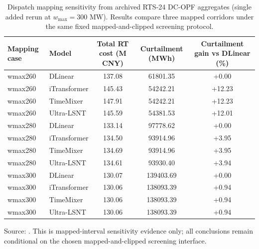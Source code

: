 ﻿\documentclass[review,1p,times]{elsarticle}
\begin{document}
\begin{table}[t]
\centering
\caption{Dispatch mapping sensitivity from archived RTS-24 DC-OPF aggregates (single added rerun at $w_{\max}=300$ MW). Results compare three mapped corridors under the same fixed mapped-and-clipped screening protocol.}
\label{tab:dispatch_mapping_sensitivity}
\begingroup
\setlength{\tabcolsep}{4pt}
\small
\begin{tabular}{llccc}
\toprule
Mapping case & Model & Total RT cost (M CNY) & Curtailment (MWh) & Curtailment gain vs DLinear (\%) \\
\midrule
wmax260 & DLinear & 137.08 & 61801.35 & +0.00 \\
wmax260 & iTransformer & 145.43 & 54242.21 & +12.23 \\
wmax260 & TimeMixer & 147.91 & 54242.21 & +12.23 \\
wmax260 & Ultra-LSNT & 145.59 & 54381.53 & +12.01 \\
\midrule
wmax280 & DLinear & 133.14 & 97778.62 & +0.00 \\
wmax280 & iTransformer & 134.50 & 93914.96 & +3.95 \\
wmax280 & TimeMixer & 134.69 & 93914.96 & +3.95 \\
wmax280 & Ultra-LSNT & 134.61 & 93930.40 & +3.94 \\
\midrule
wmax300 & DLinear & 130.07 & 139403.69 & +0.00 \\
wmax300 & iTransformer & 130.06 & 138093.39 & +0.94 \\
wmax300 & TimeMixer & 130.06 & 138093.39 & +0.94 \\
wmax300 & Ultra-LSNT & 130.06 & 138093.39 & +0.94 \\
\bottomrule
\end{tabular}
\vspace{3pt}
\footnotesize Source: . This is mapped-interval sensitivity evidence only; all conclusions remain conditional on the chosen mapped-and-clipped screening interface.
\endgroup
\end{table}
\end{document}
